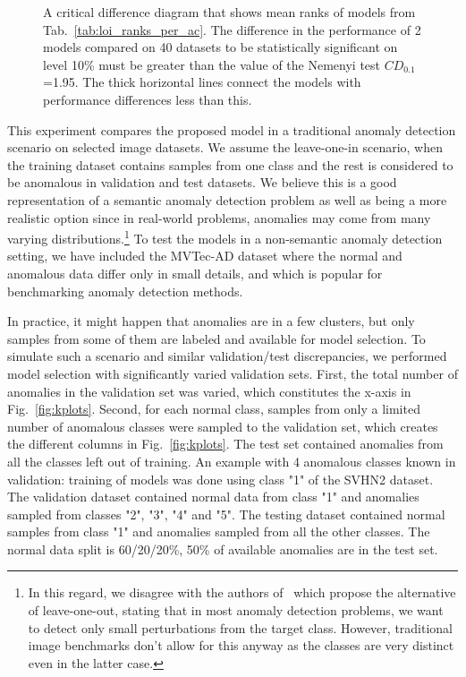 

\begin{figure}[ht!] 
    \centering
    
    \caption{A critical difference diagram that shows mean ranks of models from Tab.~\ref{tab:loi_ranks_per_ac}. The difference in the performance of 2 models compared on 40 datasets to be statistically significant on level 10\% must be greater than the value of the Nemenyi test $CD_{0.1}$=1.95. The thick horizontal lines connect the models with performance differences less than this.}
    \label{fig:cd}
\end{figure}

This experiment compares the proposed model in a traditional anomaly detection scenario on selected image datasets. We assume the leave-one-in scenario, when the training dataset contains samples from one class and the rest is considered to be anomalous in validation and test datasets. We believe this is a good representation of a semantic anomaly detection problem as well as being a more realistic option since in real-world problems, anomalies may come from many varying distributions.\footnote{In this regard, we disagree with the authors of~\cite{ahmed2020detecting} which propose the alternative of leave-one-out, stating that in most anomaly detection problems, we want to detect only small perturbations from the target class. However, traditional image benchmarks don't allow for this anyway as the classes are very distinct even in the latter case.} To test the models in a non-semantic anomaly detection setting, we have included the MVTec-AD dataset where the normal and anomalous data differ only in small details, and which is popular for benchmarking anomaly detection methods.

In practice, it might happen that anomalies are in a few clusters, but only samples from some of them are labeled and available for model selection. To simulate such a scenario and similar validation/test discrepancies, we performed model selection with significantly varied validation sets. First, the total number of anomalies in the validation set was varied, which constitutes the x-axis in Fig.~\ref{fig:kplots}. Second, for each normal class, samples from only a limited number of anomalous classes were sampled to the validation set, which creates the different columns in Fig.~\ref{fig:kplots}. The test set contained anomalies from all the classes left out of training. An example with 4 anomalous classes known in validation: training of models was done using class "1" of the SVHN2 dataset. The validation dataset contained normal data from class "1" and anomalies sampled from classes "2", "3", "4" and "5". The testing dataset contained normal samples from class "1" and anomalies sampled from all the other classes. The normal data split is 60/20/20\%, 50\% of available anomalies are in the test set. 

